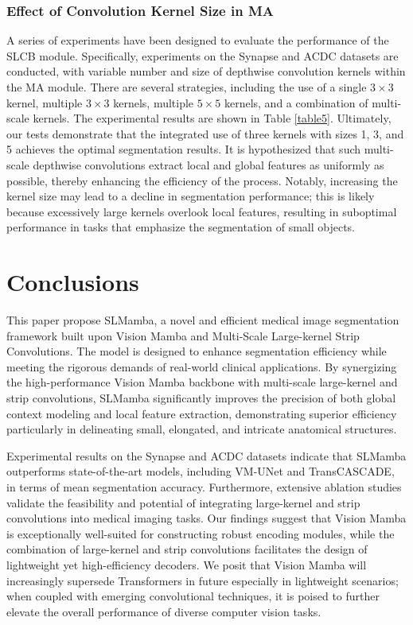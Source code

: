 \documentclass[10pt, a4paper, twocolumn]{article}
\begin{document}
\subsubsection{Effect of Convolution Kernel Size in MA}

A series of experiments have been designed to evaluate the performance of the SLCB module. Specifically, experiments on the Synapse and ACDC datasets are conducted, with variable number and size of depthwise convolution kernels within the MA module. There are several strategies, including the use of a single $3 \times 3$ kernel, multiple $3 \times 3$ kernels, multiple $5 \times 5$ kernels, and a combination of multi-scale kernels. The experimental results are shown in Table \textcolor{red}{\ref{table5}}. Ultimately, our tests demonstrate that the integrated use of three kernels with sizes 1, 3, and 5 achieves the optimal segmentation results. It is hypothesized that such multi-scale depthwise convolutions extract local and global features as uniformly as possible, thereby enhancing the efficiency of the process. Notably, increasing the kernel size may lead to a decline in segmentation performance; this is likely because excessively large kernels overlook local features, resulting in suboptimal performance in tasks that emphasize the segmentation of small objects.






\section{Conclusions}

This paper propose SLMamba, a novel and efficient medical image segmentation framework built upon Vision Mamba and Multi-Scale Large-kernel Strip Convolutions. The model is designed to enhance segmentation efficiency while meeting the rigorous demands of real-world clinical applications. By synergizing the high-performance Vision Mamba backbone with multi-scale large-kernel and strip convolutions, SLMamba significantly improves the precision of both global context modeling and local feature extraction, demonstrating superior efficiency particularly in delineating small, elongated, and intricate anatomical structures.

Experimental results on the Synapse and ACDC datasets indicate that SLMamba outperforms state-of-the-art models, including VM-UNet and TransCASCADE, in terms of mean segmentation accuracy. Furthermore, extensive ablation studies validate the feasibility and potential of integrating large-kernel and strip convolutions into medical imaging tasks. Our findings suggest that Vision Mamba is exceptionally well-suited for constructing robust encoding modules, while the combination of large-kernel and strip convolutions facilitates the design of lightweight yet high-efficiency decoders. We posit that Vision Mamba will increasingly supersede Transformers in future especially in lightweight scenarios; when coupled with emerging convolutional techniques, it is poised to further elevate the overall performance of diverse computer vision tasks.
\end{document}
